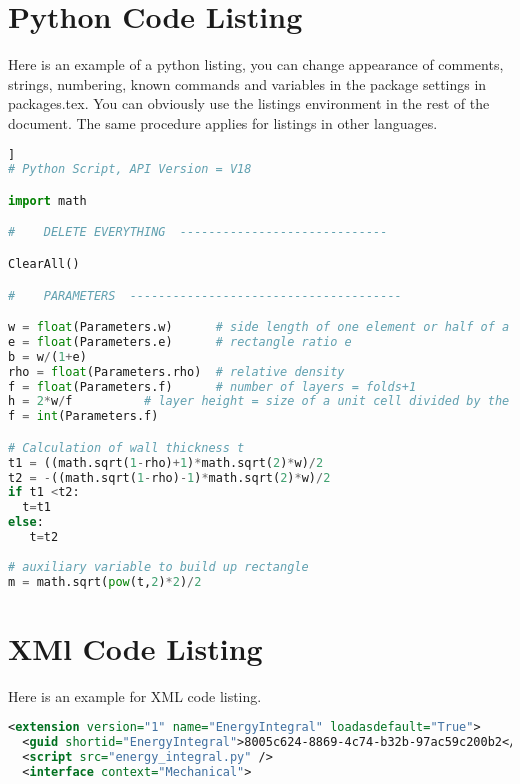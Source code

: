 \begin{appendix}
\addappheadtotoc
\section{Python Code Listing}
\label{app_a}

Here is an example of a python listing, you can change appearance of comments, strings, numbering, known commands and variables in the package settings in packages.tex. You can obviously use the listings environment in the rest of the document. The same procedure applies for listings in other languages.


\vfill

\begin{lstlisting}[language=Python, title=Python Listing Title]
  ]
# Python Script, API Version = V18

import math

#    DELETE EVERYTHING  -----------------------------

ClearAll()

#    PARAMETERS  --------------------------------------

w = float(Parameters.w)      # side length of one element or half of a unit cell
e = float(Parameters.e)      # rectangle ratio e
b = w/(1+e)               
rho = float(Parameters.rho)  # relative density
f = float(Parameters.f)      # number of layers = folds+1
h = 2*w/f          # layer height = size of a unit cell divided by the number of layers
f = int(Parameters.f)

# Calculation of wall thickness t
t1 = ((math.sqrt(1-rho)+1)*math.sqrt(2)*w)/2
t2 = -((math.sqrt(1-rho)-1)*math.sqrt(2)*w)/2
if t1 <t2:
  t=t1
else:
   t=t2
   
# auxiliary variable to build up rectangle
m = math.sqrt(pow(t,2)*2)/2

\end{lstlisting}


\vfill

\pagebreak


\section{XMl Code Listing}
Here is an example for XML code listing.
\vfill

\begin{lstlisting}[language=XML, title=XML Listing Title]
<extension version="1" name="EnergyIntegral" loadasdefault="True">
  <guid shortid="EnergyIntegral">8005c624-8869-4c74-b32b-97ac59c200b2</guid>                                  
  <script src="energy_integral.py" />
  <interface context="Mechanical">
\end{lstlisting}


\end{appendix}
